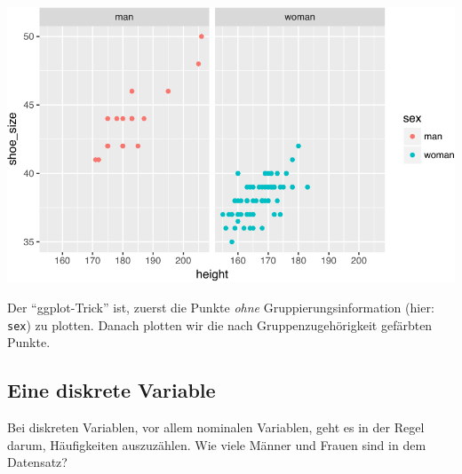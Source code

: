 \documentclass[12pt,ngerman,]{book}
\newenvironment{Shaded}{\begin{snugshade}}{\end{snugshade}}
\newcommand{\KeywordTok}[1]{\textcolor[rgb]{0.13,0.29,0.53}{\textbf{{#1}}}}
\newcommand{\DataTypeTok}[1]{\textcolor[rgb]{0.13,0.29,0.53}{{#1}}}
\newcommand{\DecValTok}[1]{\textcolor[rgb]{0.00,0.00,0.81}{{#1}}}
\newcommand{\StringTok}[1]{\textcolor[rgb]{0.31,0.60,0.02}{{#1}}}
\newcommand{\CommentTok}[1]{\textcolor[rgb]{0.56,0.35,0.01}{\textit{{#1}}}}
\newcommand{\NormalTok}[1]{{#1}}
\renewenvironment{Shaded}{\begin{kframe}}{\end{kframe}}
\begin{document}
\begin{Shaded}
\end{Shaded}

\begin{center}\includegraphics[width=0.7\linewidth]{050_Daten_visualisieren_files/figure-latex/unnamed-chunk-17-1} \end{center}

Der ``ggplot-Trick'' ist, zuerst die Punkte \emph{ohne}
Gruppierungsinformation (hier: \texttt{sex}) zu plotten. Danach plotten
wir die nach Gruppenzugehörigkeit gefärbten Punkte.

\subsection{Eine diskrete Variable}\label{eine-diskrete-variable}

Bei diskreten Variablen, vor allem nominalen Variablen, geht es in der
Regel darum, Häufigkeiten auszuzählen. Wie viele Männer und Frauen sind
in dem Datensatz?
\end{document}
